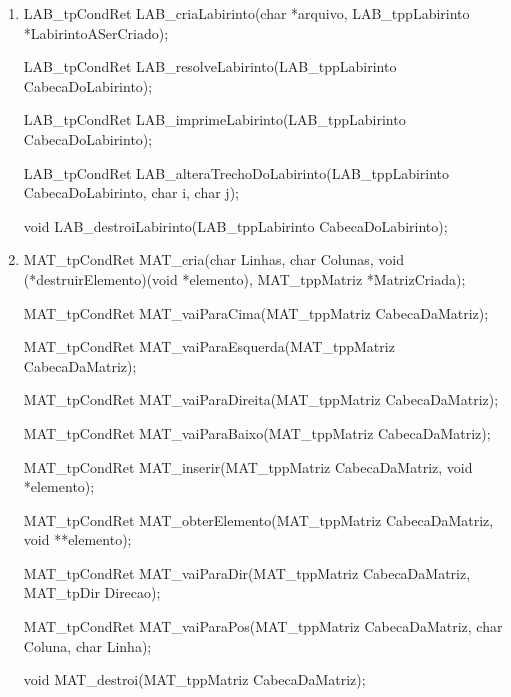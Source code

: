 \documentclass[a4paper,12pt,oneside]{book}
\begin{document}
\begin{enumerate}\setlength{\parskip}{1\baselineskip}


    \item

          LAB\_tpCondRet LAB\_criaLabirinto(char *arquivo, LAB\_tppLabirinto *LabirintoASerCriado);

          LAB\_tpCondRet LAB\_resolveLabirinto(LAB\_tppLabirinto CabecaDoLabirinto);

          LAB\_tpCondRet LAB\_imprimeLabirinto(LAB\_tppLabirinto CabecaDoLabirinto);

          LAB\_tpCondRet LAB\_alteraTrechoDoLabirinto(LAB\_tppLabirinto CabecaDoLabirinto, char i, char j);

          void LAB\_destroiLabirinto(LAB\_tppLabirinto CabecaDoLabirinto);

    \item

          MAT\_tpCondRet MAT\_cria(char Linhas, char Colunas, void (*destruirElemento)(void *elemento), MAT\_tppMatriz *MatrizCriada);

          MAT\_tpCondRet MAT\_vaiParaCima(MAT\_tppMatriz CabecaDaMatriz);

          MAT\_tpCondRet MAT\_vaiParaEsquerda(MAT\_tppMatriz CabecaDaMatriz);

          MAT\_tpCondRet MAT\_vaiParaDireita(MAT\_tppMatriz CabecaDaMatriz);

          MAT\_tpCondRet MAT\_vaiParaBaixo(MAT\_tppMatriz CabecaDaMatriz);

          MAT\_tpCondRet MAT\_inserir(MAT\_tppMatriz CabecaDaMatriz, void *elemento);

          MAT\_tpCondRet MAT\_obterElemento(MAT\_tppMatriz CabecaDaMatriz, void **elemento);

          MAT\_tpCondRet MAT\_vaiParaDir(MAT\_tppMatriz CabecaDaMatriz, MAT\_tpDir Direcao);

          MAT\_tpCondRet MAT\_vaiParaPos(MAT\_tppMatriz CabecaDaMatriz, char Coluna, char Linha);

          void MAT\_destroi(MAT\_tppMatriz CabecaDaMatriz);

          \setlength{\parskip}{1pt}


\end{enumerate}

% 
% 
% 
% 
% 
% 
% 
\end{document}
